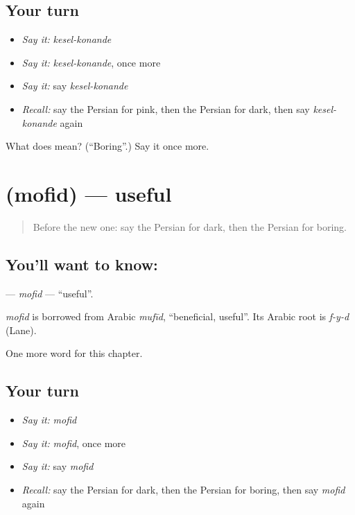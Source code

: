 \subsection*{Your turn}
\begin{itemize}
\raggedright
  \item \emph{Say it:} \emph{kesel-konande}
  \item \emph{Say it:} \emph{kesel-konande}, once more
  \item \emph{Say it:} say \emph{kesel-konande}
  \item \emph{Recall:} say the Persian for pink, then the Persian for dark, then say \emph{kesel-konande} again
\end{itemize}

\begin{tcolorbox}[breakable,colback=teal!4,colframe=teal!35!black,title={Before you move on}]
What does   mean? (\textquotedblleft{}Boring\textquotedblright{}.) Say it once more.
\end{tcolorbox}
\section[\texorpdfstring{\fa{مفید} (mofid)}{مفید (mofid)}]{ (mofid) — useful}

\label{lesson:FA-C273-mofid}



\begin{quote}
Before the new one: say the Persian for dark, then the Persian for boring.
\end{quote}

\subsection*{You'll want to know: }
\textbf{} — \emph{mofid} — \textquotedblleft{}useful\textquotedblright{}.

\begin{cousinweb}
\emph{mofid} is borrowed from Arabic \emph{mufīd}, \textquotedblleft{}beneficial, useful\textquotedblright{}. Its Arabic root is \emph{f-y-d} (Lane).
\end{cousinweb}

\begin{grammarlens}[title={What you've built}]
One more word for this chapter.
\end{grammarlens}

\subsection*{Your turn}
\begin{itemize}
\raggedright
  \item \emph{Say it:} \emph{mofid}
  \item \emph{Say it:} \emph{mofid}, once more
  \item \emph{Say it:} say \emph{mofid}
  \item \emph{Recall:} say the Persian for dark, then the Persian for boring, then say \emph{mofid} again
\end{itemize}

